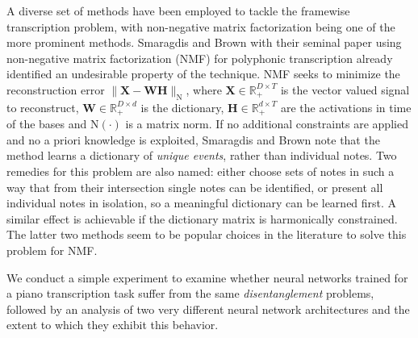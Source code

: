 A diverse set of methods have been employed to tackle the framewise transcription problem, with non-negative matrix factorization being one of the more prominent methods.
Smaragdis and Brown with their seminal paper \cite{Smaragdis_Brown_2003} using non-negative matrix factorization (NMF) for polyphonic transcription already identified an undesirable property of the technique. NMF seeks to minimize the reconstruction error $\|\mathbf{X} - \mathbf{W}\mathbf{H}\|_{\mathrm{N}}$, where $\mathbf{X} \in \mathbb{R}_{+}^{D \times T}$ is the vector valued signal to reconstruct, $\mathbf{W} \in \mathbb{R}_{+}^{D \times d}$ is the dictionary, $\mathbf{H} \in \mathbb{R}_{+}^{d \times T}$ are the activations in time of the bases and $\mathrm{N}(\cdot)$ is a matrix norm. If no additional constraints are applied and no a priori knowledge is exploited, Smaragdis and Brown \cite{Smaragdis_Brown_2003} note that the method learns a dictionary of \textit{unique events}, rather than individual notes. Two remedies for this problem are also named: either choose sets of notes in such a way that from their intersection single notes can be identified, or present all individual notes in isolation, so a meaningful dictionary can be learned first. A similar effect is achievable if the dictionary matrix is harmonically constrained. The latter two methods seem to be popular choices in the literature \cite{Smaragdis_Brown_2003, Benetos_Ewert_Weyde_2014, Bertin_Badeau_Richard_2007, Bertin_Badeau_Vincent_2009, Dessein_Cont_Lemaitre_2010, Grindlay_Ellis_2009, OHanlon_Plumbley_2014, Vincent_Bertin_Badeau_2010, Weninger_Kirst_Schuller_Bungartz_2013, Khlif_Sethu_2015} to solve this problem for NMF.

We conduct a simple experiment to examine whether neural networks trained for a piano transcription task suffer from the same \textit{disentanglement} problems, followed by an analysis of two very different neural network architectures and the extent to which they exhibit this behavior.

